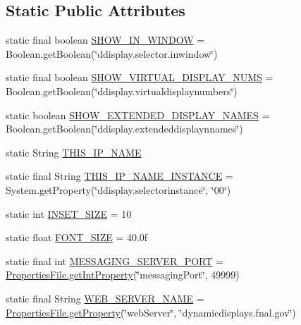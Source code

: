 \subsection*{Static Public Attributes}
\begin{DoxyCompactItemize}
\item 
static final boolean \hyperlink{classgov_1_1fnal_1_1ppd_1_1dd_1_1GlobalVariables_af0e7b37c8bf6495b999b93ed0f4f1c76}{S\-H\-O\-W\-\_\-\-I\-N\-\_\-\-W\-I\-N\-D\-O\-W} = Boolean.\-get\-Boolean(\char`\"{}ddisplay.\-selector.\-inwindow\char`\"{})
\item 
static final boolean \hyperlink{classgov_1_1fnal_1_1ppd_1_1dd_1_1GlobalVariables_a7ccfa5abda77efe03cd888f14d4171a3}{S\-H\-O\-W\-\_\-\-V\-I\-R\-T\-U\-A\-L\-\_\-\-D\-I\-S\-P\-L\-A\-Y\-\_\-\-N\-U\-M\-S} = Boolean.\-get\-Boolean(\char`\"{}ddisplay.\-virtualdisplaynumbers\char`\"{})
\item 
static boolean \hyperlink{classgov_1_1fnal_1_1ppd_1_1dd_1_1GlobalVariables_a24c624ba470a455c7ed0c43d72a9f417}{S\-H\-O\-W\-\_\-\-E\-X\-T\-E\-N\-D\-E\-D\-\_\-\-D\-I\-S\-P\-L\-A\-Y\-\_\-\-N\-A\-M\-E\-S} = Boolean.\-get\-Boolean(\char`\"{}ddisplay.\-extendeddisplaynnames\char`\"{})
\item 
static String \hyperlink{classgov_1_1fnal_1_1ppd_1_1dd_1_1GlobalVariables_a35adf140ccbaaf275e34d1539424828a}{T\-H\-I\-S\-\_\-\-I\-P\-\_\-\-N\-A\-M\-E}
\item 
static final String \hyperlink{classgov_1_1fnal_1_1ppd_1_1dd_1_1GlobalVariables_ae5fe9c75fedaa742e5f68baad8768d7f}{T\-H\-I\-S\-\_\-\-I\-P\-\_\-\-N\-A\-M\-E\-\_\-\-I\-N\-S\-T\-A\-N\-C\-E} = System.\-get\-Property(\char`\"{}ddisplay.\-selectorinstance\char`\"{}, \char`\"{}00\char`\"{})
\item 
static int \hyperlink{classgov_1_1fnal_1_1ppd_1_1dd_1_1GlobalVariables_a938952f27836544cbcf8eed0fceecb99}{I\-N\-S\-E\-T\-\_\-\-S\-I\-Z\-E} = 10
\item 
static float \hyperlink{classgov_1_1fnal_1_1ppd_1_1dd_1_1GlobalVariables_a9331af89f789ea1b54581c0198f7a43d}{F\-O\-N\-T\-\_\-\-S\-I\-Z\-E} = 40.\-0f
\item 
static final int \hyperlink{classgov_1_1fnal_1_1ppd_1_1dd_1_1GlobalVariables_a3afb8f4fd1dbbc82329ea9ff4aa3629e}{M\-E\-S\-S\-A\-G\-I\-N\-G\-\_\-\-S\-E\-R\-V\-E\-R\-\_\-\-P\-O\-R\-T} = \hyperlink{classgov_1_1fnal_1_1ppd_1_1dd_1_1util_1_1nonguiUtils_1_1PropertiesFile_a5ed1fc6f67450475cdff0256ca4d6aad}{Properties\-File.\-get\-Int\-Property}(\char`\"{}messaging\-Port\char`\"{}, 49999)
\item 
static final String \hyperlink{classgov_1_1fnal_1_1ppd_1_1dd_1_1GlobalVariables_af5ffb15826513fabba402ec017edbc70}{W\-E\-B\-\_\-\-S\-E\-R\-V\-E\-R\-\_\-\-N\-A\-M\-E} = \hyperlink{classgov_1_1fnal_1_1ppd_1_1dd_1_1util_1_1nonguiUtils_1_1PropertiesFile_ad3e5ac77723df18cb845643e3e219f49}{Properties\-File.\-get\-Property}(\char`\"{}web\-Server\char`\"{}, \char`\"{}dynamicdisplays.\-fnal.\-gov\char`\"{})

\end{DoxyCompactItemize}

